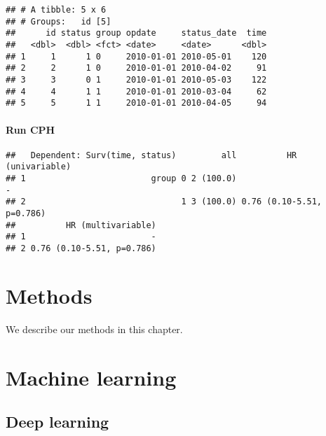 \documentclass[]{book}
\newenvironment{Shaded}{\begin{snugshade}}{\end{snugshade}}
\newcommand{\KeywordTok}[1]{\textcolor[rgb]{0.13,0.29,0.53}{\textbf{#1}}}
\newcommand{\NormalTok}[1]{#1}
\newcommand{\OperatorTok}[1]{\textcolor[rgb]{0.81,0.36,0.00}{\textbf{#1}}}
\newcommand{\StringTok}[1]{\textcolor[rgb]{0.31,0.60,0.02}{#1}}
\begin{document}
\begin{verbatim}
## # A tibble: 5 x 6
## # Groups:   id [5]
##      id status group opdate     status_date  time
##   <dbl>  <dbl> <fct> <date>     <date>      <dbl>
## 1     1      1 0     2010-01-01 2010-05-01    120
## 2     2      1 0     2010-01-01 2010-04-02     91
## 3     3      0 1     2010-01-01 2010-05-03    122
## 4     4      1 1     2010-01-01 2010-03-04     62
## 5     5      1 1     2010-01-01 2010-04-05     94
\end{verbatim}

\hypertarget{run-cph}{%
\subsubsection{Run CPH}\label{run-cph}}

\begin{Shaded}
\end{Shaded}

\begin{verbatim}
##   Dependent: Surv(time, status)         all          HR (univariable)
## 1                         group 0 2 (100.0)                         -
## 2                               1 3 (100.0) 0.76 (0.10-5.51, p=0.786)
##          HR (multivariable)
## 1                         -
## 2 0.76 (0.10-5.51, p=0.786)
\end{verbatim}

\hypertarget{methods}{%
\chapter{Methods}\label{methods}}

We describe our methods in this chapter.

\hypertarget{machine-learning}{%
\chapter{Machine learning}\label{machine-learning}}

\hypertarget{deep-learning}{%
\section{Deep learning}\label{deep-learning}}
\end{document}
